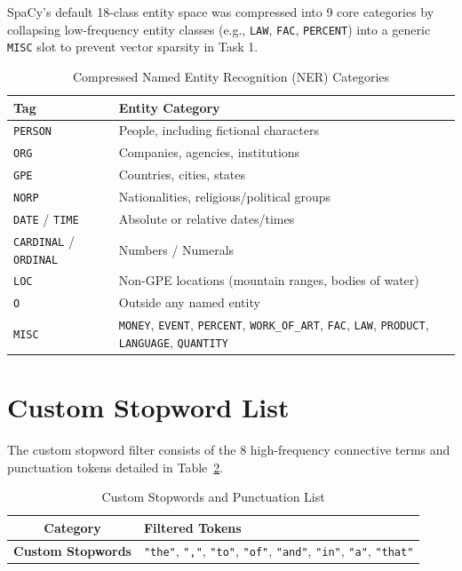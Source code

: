 \documentclass[12pt, a4paper]{article}
\begin{document}
SpaCy's default 18-class entity space was compressed into 9 core categories by collapsing low-frequency entity classes (e.g., \texttt{LAW}, \texttt{FAC}, \texttt{PERCENT}) into a generic \texttt{MISC} slot to prevent vector sparsity in Task 1.

\begin{table}[htbp]
  \centering
  \caption{Compressed Named Entity Recognition (NER) Categories}
  \label{tab:ner_mapping}
  \small
  \begin{tabularx}{\textwidth}{>{\centering\arraybackslash}p{3.2cm} X}
    \toprule
    \textbf{Tag} & \textbf{Entity Category} \\
    \midrule
    \texttt{PERSON} & People, including fictional characters \\
    \addlinespace
    \texttt{ORG} & Companies, agencies, institutions \\
    \addlinespace
    \texttt{GPE} & Countries, cities, states \\
    \addlinespace
    \texttt{NORP} & Nationalities, religious/political groups \\
    \addlinespace
    \texttt{DATE} / \texttt{TIME} & Absolute or relative dates/times \\
    \addlinespace
    \texttt{CARDINAL} / \texttt{ORDINAL} & Numbers / Numerals \\
    \addlinespace
    \texttt{LOC} & Non-GPE locations (mountain ranges, bodies of water) \\
    \addlinespace
    \texttt{O} & Outside any named entity \\
    \addlinespace
    \texttt{MISC} & \texttt{MONEY}, \texttt{EVENT}, \texttt{PERCENT}, \texttt{WORK\_OF\_ART}, \texttt{FAC}, \texttt{LAW}, \texttt{PRODUCT}, \texttt{LANGUAGE}, \texttt{QUANTITY} \\
    \bottomrule
  \end{tabularx}
\end{table}


\newpage
\section{Custom Stopword List}
\label{app:stopwords}

The custom stopword filter consists of the 8 high-frequency connective terms and punctuation tokens detailed in Table~\ref{tab:stopwords}.

\begin{table}[htbp]
  \centering
  \caption{Custom Stopwords and Punctuation List}
  \label{tab:stopwords}
  \small
  \begin{tabularx}{\textwidth}{c X}
    \toprule
    \textbf{Category} & \textbf{Filtered Tokens} \\
    \midrule
    \textbf{Custom Stopwords} & \texttt{"the"}, \texttt{","}, \texttt{"to"}, \texttt{"of"}, \texttt{"and"}, \texttt{"in"}, \texttt{"a"}, \texttt{"that"} \\
    \bottomrule
  \end{tabularx}
\end{table}
\end{document}

